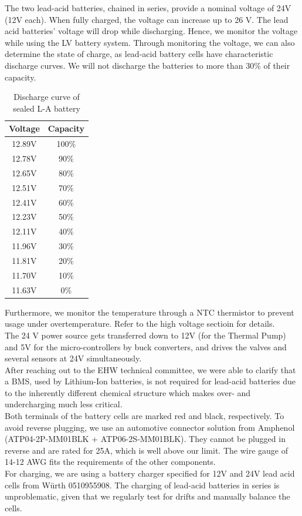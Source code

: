 The two lead-acid batteries, chained in series, provide a nominal voltage of 24V (12V each). When fully charged, the voltage can increase up to 26 V. The lead acid batteries' voltage will drop while discharging. Hence, we monitor the voltage while using the LV battery system. Through monitoring the voltage, we can also determine the state of charge, as lead-acid battery cells have characteristic discharge curves. We will not discharge the batteries to more than 30\% of their capacity.
\begin{table}[h]
    \centering
    \begin{tabular}{|c|c|}
       \hline
       Voltage & Capacity \\
       \hline
       12.89V & 100\% \\
       \hline
       12.78V & 90\% \\
       \hline
       12.65V & 80\% \\
       \hline
       12.51V & 70\% \\
       \hline
       12.41V & 60\% \\
       \hline
       12.23V & 50\% \\
       \hline
       12.11V & 40\% \\
       \hline
       11.96V & 30\% \\
       \hline
       11.81V & 20\% \\
       \hline
       11.70V & 10\% \\
       \hline
       11.63V & 0\% \\
       \hline
    \end{tabular}
    \caption{Discharge curve of sealed L-A battery}
    \label{lead-acid-discharge-curve}
\end{table}
Furthermore, we monitor the temperature through a NTC thermistor to prevent usage under overtemperature. Refer to the high voltage sectioin for details. \\
The 24 V power source gets transferred down to 12V (for the Thermal Pump) and 5V for the micro-controllers by buck converters, and drives the valves and several sensors at 24V simultaneously. \\
After reaching out to the EHW technical committee, we were able to clarify that a BMS, used by Lithium-Ion batteries, is not required for lead-acid batteries due to the inherently different chemical structure which makes over- and undercharging much less critical. \\
Both terminals of the battery cells are marked red and black, respectively. To avoid reverse plugging, we use an automotive connector solution from Amphenol (ATP04-2P-MM01BLK + ATP06-2S-MM01BLK). They cannot be plugged in reverse and are rated for 25A, which is well above our limit. The wire gauge of 14-12 AWG fits the requirements of the other components. \\
For charging, we are using a battery charger specified for 12V and 24V lead acid cells from Würth 0510955908. The charging of lead-acid batteries in series is unproblematic, given that we regularly test for drifts and manually balance the cells.\\


